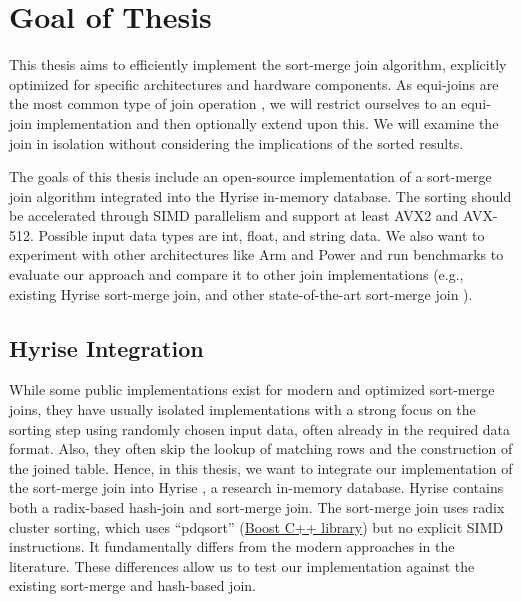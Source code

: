 \section{Goal of Thesis}
\label{sec:goal}

This thesis aims to efficiently implement the sort-merge join algorithm, explicitly optimized 
for specific architectures and hardware components. As equi-joins are the most common type of 
join operation \cite{DBLP:conf/cloud/BlanasP13}, we will restrict ourselves to an equi-join implementation and then optionally
extend upon this. We will examine the join in isolation without considering the implications of the sorted results.

The goals of this thesis include an open-source implementation of a sort-merge join algorithm
integrated into the Hyrise in-memory database. The sorting should be accelerated through SIMD
parallelism and support at least AVX2 and AVX-512. Possible input data types are int, float, and string
data. We also want to experiment with other architectures like Arm and Power and run benchmarks to
evaluate our approach and compare it to other join implementations
(e.g., existing Hyrise sort-merge join, and other state-of-the-art sort-merge join \cite{Balkesen}).

\subsection{Hyrise Integration}
While some public implementations
exist for modern and optimized sort-merge joins, they have usually isolated implementations with a strong
focus on the sorting step using randomly chosen input data, often already in the required data format. 
Also, they often skip the lookup of matching rows and the construction of the joined table.
Hence, in this thesis, we want to integrate our implementation of the sort-merge join into Hyrise
\cite{DBLP:conf/edbt/DreselerK0KUP19},
a research in-memory database. Hyrise contains both a radix-based hash-join and sort-merge join.
The sort-merge join uses radix cluster sorting, which uses ``pdqsort'' (\href{https://www.boost.org/}{Boost C++ library})
but no explicit SIMD instructions. It fundamentally differs from the modern approaches in the literature.
These differences allow us to test our implementation against the existing sort-merge and hash-based join.

